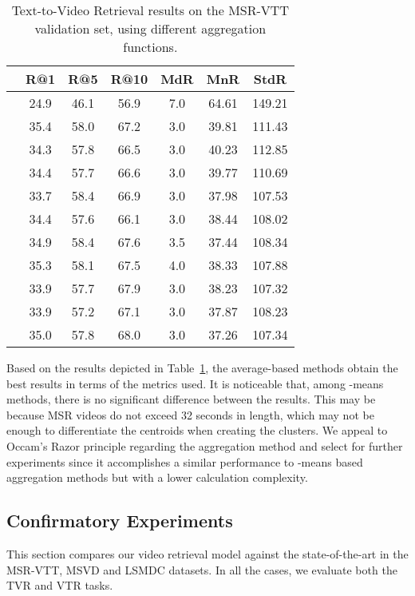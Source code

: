 \documentclass[a4paper,runningheads]{llncs}
\begin{document}
\begin{table}[ht!]
\centering
\begin{tabular}{ccccccc}
\toprule
\textbf{} & \textbf{R@1} & \textbf{R@5} & \textbf{R@10} & \textbf{MdR} & \textbf{MnR} & \textbf{StdR} \\ 
\midrule
 & 24.9 & 46.1 & 56.9 & 7.0 & 64.61 & 149.21 \\
 & 35.4 & 58.0 & 67.2 & 3.0 & 39.81 & 111.43 \\
 & 34.3 & 57.8 & 66.5 & 3.0 & 40.23 & 112.85 \\
 & 34.4 & 57.7 & 66.6 & 3.0 & 39.77 & 110.69 \\
 & 33.7 & 58.4 & 66.9 & 3.0 & 37.98 & 107.53 \\
 & 34.4 & 57.6 & 66.1 & 3.0 & 38.44 & 108.02 \\
 & 34.9 & 58.4 & 67.6 & 3.5 & 37.44 & 108.34 \\
 & 35.3 & 58.1 & 67.5 & 4.0 & 38.33 & 107.88 \\
 & 33.9 & 57.7 & 67.9 & 3.0 & 38.23 & 107.32 \\
 & 33.9 & 57.2 & 67.1 & 3.0 & 37.87 & 108.23 \\
 & 35.0 & 57.8 & 68.0 & 3.0 & 37.26 & 107.34 \\
\bottomrule
\end{tabular}
\caption{Text-to-Video Retrieval results on the MSR-VTT validation set, using different aggregation functions.}
\label{table:MSRLambda}
\end{table}

Based on the results depicted in Table~\ref{table:MSRLambda}, the average-based methods obtain the best results in terms of the metrics used. It is noticeable that, among -means methods, there is no significant difference between the results. This may be because MSR videos do not exceed 32 seconds in length, which may not be enough to differentiate the centroids when creating the clusters. We appeal to Occam's Razor principle regarding the aggregation method and select  for further experiments since it accomplishes a similar performance to -means based aggregation methods but with a lower calculation complexity.

\subsection{Confirmatory Experiments}
\label{sec:ConfirmatoryExperiments}

This section compares our video retrieval model against the state-of-the-art in the MSR-VTT, MSVD and LSMDC datasets. In all the cases, we evaluate both the TVR and VTR tasks.
\end{document}
